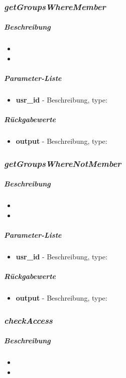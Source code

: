\subsubsection*{\textit{getGroupsWhereMember}}\label{getGroupsWhereMemberMGUI}
\subparagraph{Beschreibung}
\begin{itemize}
	\item[] \noindent{} 
	\item[] 
\end{itemize}
\subparagraph{Parameter-Liste}
\begin{itemize}
	\item[] \textbf{usr\_id} - Beschreibung, type: 
\end{itemize}
\subparagraph{Rückgabewerte}
\begin{itemize}
	\item[] \textbf{output} - Beschreibung, type:
\end{itemize}

\subsubsection*{\textit{getGroupsWhereNotMember}}\label{getGroupsWhereNotMemberMGUI}
\subparagraph{Beschreibung}
\begin{itemize}
	\item[] \noindent{} 
	\item[] 
\end{itemize}
\subparagraph{Parameter-Liste}
\begin{itemize}
	\item[] \textbf{usr\_id} - Beschreibung, type: 
\end{itemize}
\subparagraph{Rückgabewerte}
\begin{itemize}
	\item[] \textbf{output} - Beschreibung, type:
\end{itemize}

\subsubsection*{\textit{checkAccess}}\label{checkAccessMGUI}
\subparagraph{Beschreibung}
\begin{itemize}
	\item[] \noindent{} 
	\item[] 
\end{itemize}